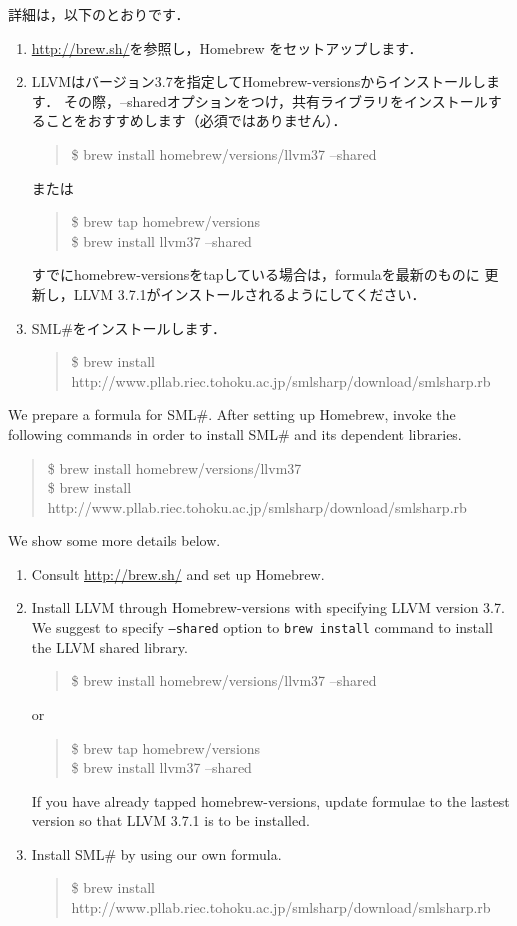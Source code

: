 \documentclass{jbook}
\newcommand{\smlsharp}{SML\#}
\newenvironment{program}{\begin{quote}\begin{tt}}%
                        {\end{tt}\end{quote}}
\begin{document}
	詳細は，以下のとおりです．
\begin{enumerate}
\item 
	\url{http://brew.sh/}を参照し，Homebrew をセットアップします．

\item
	LLVMはバージョン3.7を指定してHomebrew-versionsからインストールします．
	その際，--sharedオプションをつけ，共有ライブラリをインストールすることをおすすめします（必須ではありません）．
\begin{program}
\$ brew install homebrew/versions/llvm37 --shared
\end{program}
	または
\begin{program}
\$ brew tap homebrew/versions\\
\$ brew install llvm37 --shared
\end{program}
	すでにhomebrew-versionsをtapしている場合は，formulaを最新のものに
更新し，LLVM 3.7.1がインストールされるようにしてください．

\item
	\smlsharp{}をインストールします．
\begin{program}
\$ brew install http://www.pllab.riec.tohoku.ac.jp/smlsharp/download/smlsharp.rb
\end{program}
\end{enumerate}

\else%

	We prepare a formula for \smlsharp{}.
	After setting up Homebrew, invoke the following commands in order to
install \smlsharp{} and its dependent libraries.
\begin{program}
\$ brew install homebrew/versions/llvm37\\
\$ brew install http://www.pllab.riec.tohoku.ac.jp/smlsharp/download/smlsharp.rb
\end{program}

	We show some more details below.
\begin{enumerate}
\item 
	Consult \url{http://brew.sh/} and set up Homebrew.

\item
	Install LLVM through Homebrew-versions with specifying LLVM version 3.7.
	We suggest to specify {\tt --shared} option to {\tt brew install} command
to install the LLVM shared library.
\begin{program}
\$ brew install homebrew/versions/llvm37 --shared
\end{program}
or
\begin{program}
\$ brew tap homebrew/versions\\
\$ brew install llvm37 --shared
\end{program}
	If you have already tapped homebrew-versions, update formulae to the
lastest version so that LLVM 3.7.1 is to be installed.

\item
	Install \smlsharp{} by using our own formula.
\begin{program}
\$ brew install http://www.pllab.riec.tohoku.ac.jp/smlsharp/download/smlsharp.rb
\end{program}
\end{enumerate}
\end{document}
